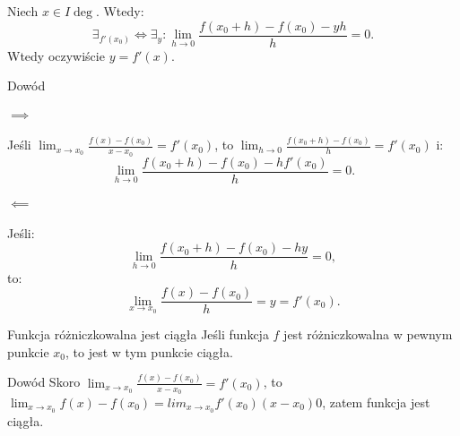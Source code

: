 \documentclass{article}
\numberwithin{defi}{section}
\numberwithin{defi}{section}
\begin{document}
    \begin{twier}[label=twier:poch-do-0]{}
        Niech $x \in I \deg$. Wtedy:\begin{equation}
            \exists_{f'(x_0)} \iff \exists_{y}: \lim_{h \to 0} \frac{f(x_0+h) - f(x_0) - y h}{h} = 0.
        \end{equation} Wtedy oczywiście $y = f'(x)$.
    \end{twier}

    \begin{dow}{Dowód}
        \paragraph{$\implies$} Jeśli $\lim_{x \to x_0} \frac{f(x) - f(x_0)}{x - x_0} = f'(x_0)$, to $\lim_{h \to 0} \frac{f(x_0 + h) - f(x_0)}{h} = f'(x_0)$ i: \begin{equation*}
            \lim_{h \to 0} \frac{f(x_0 + h) - f(x_0) - h f'(x_0)}{h} = 0.            
        \end{equation*}

        \paragraph{$\impliedby$} Jeśli: \begin{equation*}
            \lim_{h \to 0} \frac{f(x_0 + h) - f(x_0) - h  y}{h} = 0,
        \end{equation*} to: \begin{equation*}
            \lim_{x \to x_0} \frac{f(x) - f(x_0)}{h} = y = f'(x_0).
        \end{equation*}
    \end{dow}

    \begin{twier}{Funkcja różniczkowalna jest ciągła}
        Jeśli funkcja $f$ jest różniczkowalna w pewnym punkcie $x_0$, to jest w tym punkcie ciągła.
    \end{twier}

    \begin{dow}{Dowód}
        Skoro $\lim_{x \to x_0} \frac{f(x) - f(x_0)}{x - x_0} = f'(x_0)$, to $\lim_{x \to x_0} f(x) - f(x_0)= lim_{x \to x_0} f'(x_0) (x - x_0) 0$, zatem funkcja jest ciągła.

    \end{dow}
\end{document}
